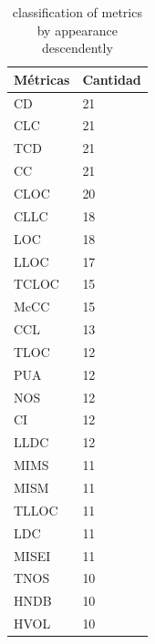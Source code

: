 \begin{table}[H]
\caption{\label{table:metricsCount} classification of metrics by appearance descendently}
\begin{center}
\begin{tabular}{ll}
\textbf{Métricas} & \textbf{Cantidad} \\
\hline
CD              & 21             \\
CLC             & 21             \\
TCD             & 21             \\
CC              & 21             \\
CLOC            & 20             \\
CLLC            & 18             \\
LOC             & 18             \\
LLOC            & 17             \\
TCLOC           & 15             \\
McCC            & 15             \\
CCL             & 13             \\
TLOC            & 12             \\
PUA             & 12             \\
NOS             & 12             \\
CI              & 12             \\
LLDC            & 12             \\
MIMS            & 11             \\
MISM            & 11             \\
TLLOC           & 11             \\
LDC             & 11             \\
MISEI           & 11             \\
TNOS            & 10             \\
HNDB            & 10             \\
HVOL            & 10            
\end{tabular}
\end{center}
\end{table}